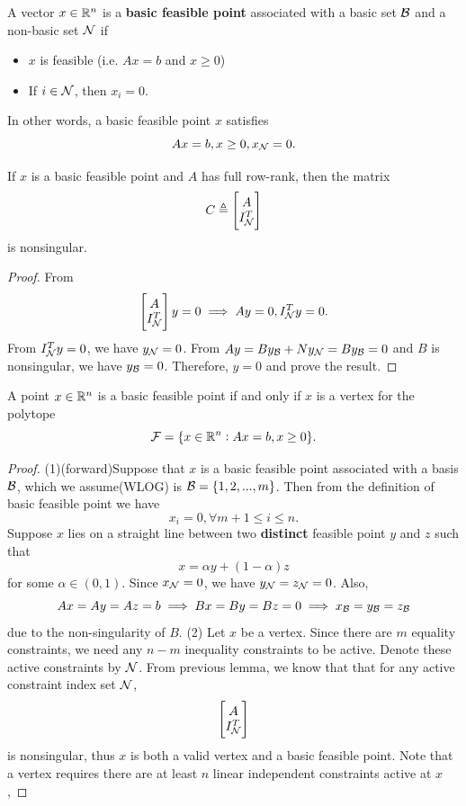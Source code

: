 \begin{refsection}
\begin{definition}
A vector $x\in\mathbb{R}^n$ is a \textbf{basic feasible point} associated with a basic set $\mathcal{B}$ and a non-basic set $\mathcal{N}$ if
\begin{itemize}
	\item $x$ is feasible (i.e. $Ax = b$ and $x \geq 0$)
	\item If $i\in \mathcal{N}$, then $x_i = 0$.
\end{itemize} 

In other words, a basic feasible point $x$ satisfies
$$Ax = b, x\geq 0, x_{\mathcal{N}} = 0.$$
\end{definition}

\begin{lemma}
	If $x$ is a basic feasible point and $A$ has full row-rank, then the matrix
	$$C \triangleq \begin{bmatrix}
	A\\
	I^T_{\mathcal{N}}
	\end{bmatrix}$$
	is nonsingular.
\end{lemma}
\begin{proof}
From $$\begin{bmatrix}
A\\
I^T_{\mathcal{N}}
\end{bmatrix} y = 0 \implies Ay = 0, I^T_{\mathcal{N}} y = 0.$$
From $I^T_{\mathcal{N}} y = 0$, we have $y_{\mathcal{N}} = 0$. 
From $Ay = By_{\mathcal{B}} + Ny_{\mathcal{N}} = By_{\mathcal{B}} = 0 $ and $B$ is nonsingular, we have $y_{\mathcal{B}} = 0$. Therefore, $y = 0$ and prove the result.
\end{proof}


\begin{lemma}
A point $x\in \mathbb{R}^n$ is a basic feasible point if and only if $x$ is a vertex for the polytope
$$\mathcal{F}=\{x\in\mathbb{R}^n: Ax = b, x\geq 0\}.$$
\end{lemma}
\begin{proof}
(1)(forward)Suppose that $x$ is a basic feasible point associated with a basis $\mathcal{B}$, which we assume(WLOG) is $\mathcal{B}=\{1,2,...,m\}$. Then from the definition of basic feasible point we have
$$x_i = 0, \forall m+1 \leq i \leq n.$$
Suppose $x$ lies on a straight line between two \textbf{distinct} feasible point $y$ and $z$ such that
$$x = \alpha y + (1-\alpha) z$$
for some $\alpha \in (0,1)$.
Since $x_{\mathcal{N}} = 0$, we have $y_{\mathcal{N}} = z_{\mathcal{N}} = 0$. 
Also, 
$$Ax = Ay = Az = b \implies Bx = By = Bz = 0 \implies x_{\mathcal{B}} = y_{\mathcal{B}} = z_{\mathcal{B}}$$
due to the non-singularity of $B$.
(2) 
 Let $x$ be a vertex. Since there are $m$ equality constraints, we need any $n-m$ inequality constraints to be active. Denote these active constraints by $\mathcal{N}$. From previous lemma, we know that that for any active constraint index set $\mathcal{N}$,
 $$\begin{bmatrix}
 A\\
 I^T_{\mathcal{N}}
 \end{bmatrix}$$
  is nonsingular, thus $x$ is both a valid vertex and a basic feasible point. Note that a vertex requires there are at least $n$ linear independent constraints active at $x$, 
\end{proof}








\end{refsection}
